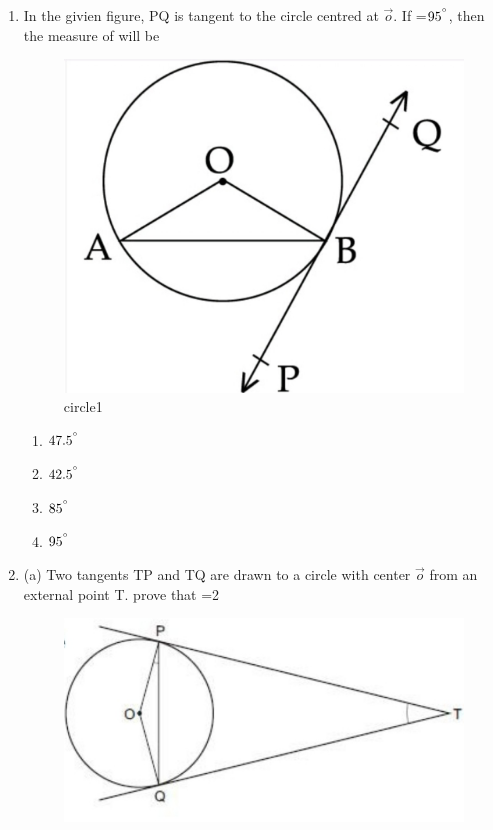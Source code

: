 \documentclass[10pt,a4paper]{article}
\begin{document}
\begin{enumerate}
\item In the givien figure, PQ is tangent to the circle centred at $\vec{o}$. If =$95^{\degree}$, then the measure of  will be
\begin{figure}[!h]
\centering
	\includegraphics[scale=0.15]{fig1.jpg}
	\caption{circle1}
	\label{fig=pic}
\end{figure}
		\begin{enumerate}
			\item $47.5^{\degree}$
			\item $42.5^{\degree}$
			\item $85^{\degree}$
			\item $95^{\degree}$
		\end{enumerate}
	\item (a) Two tangents TP and TQ are drawn to a circle with center $\vec{o}$ from an external point T.
		prove that =2
		\begin{figure}[!h]
			\centering
			\includegraphics[scale=0.35]{fig2.jpg}

\end{figure}
\end{enumerate}
\end{document}
